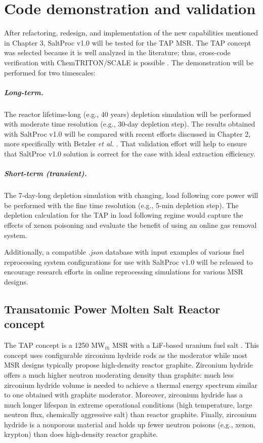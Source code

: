 \chapter[Code demonstration and validation]{Code demonstration and validation}

After refactoring, redesign, and implementation of the new capabilities 
mentioned in Chapter 3, SaltProc v1.0 will be tested for the \gls{TAP} 
\gls{MSR}. The \gls{TAP} concept was selected because it is well analyzed in 
the literature\cite{betzler_two-dimensional_2017, betzler_assessment_2017}; 
thus, cross-code verification with ChemTRITON/SCALE is possible 
\cite{betzler_assessment_2017}. The demonstration will be performed for two 
timescales:
\paragraph{Long-term.} The reactor lifetime-long (e.g., 40 years) depletion 
simulation will be performed with moderate time resolution (e.g., 30-day 
depletion step). The results obtained with SaltProc v1.0 will be compared 
with recent efforts discussed in Chapter 2, more specifically with Betzler 
\emph{et al.}  \cite{betzler_assessment_2017}. That validation effort will 
help to ensure that SaltProc v1.0 solution is correct for the case with ideal 
extraction efficiency.
\paragraph{Short-term (transient).} The 7-day-long depletion simulation with 
changing, load following core power will be performed with the fine time 
resolution (e.g., 5-min depletion step). The depletion calculation for the 
\gls{TAP} in load following regime would capture the effects of xenon 
poisoning and evaluate the benefit of using an online gas removal system.

Additionally, a compatible \textit{.json} database with input examples of 
various fuel reprocessing system configurations for use with SaltProc v1.0 
will be released to encourage research efforts in online reprocessing 
simulations for various \gls{MSR} designs.

\section{Transatomic Power Molten Salt Reactor concept}
The \gls{TAP} concept is a 1250 MW$_{th}$ \gls{MSR} with a LiF-based uranium 
fuel salt \cite{transatomic_power_corporation_technical_2016}. This concept 
uses configurable zirconium hydride rods as the moderator while most \gls{MSR} 
designs typically propose high-density reactor graphite. Zirconium hydride 
offers a much higher neutron moderating density than graphite: much less 
zirconium hydride volume is needed to achieve a thermal energy spectrum 
similar to one obtained with graphite moderator. Moreover, zirconium hydride 
has a much longer lifespan in extreme operational conditions (high 
temperature, large neutron flux, chemically aggressive salt) than reactor 
graphite. Finally, zirconium hydride is a nonporous material and holds up 
fewer neutron poisons (e.g., xenon, krypton) than does high-density 
reactor graphite.

